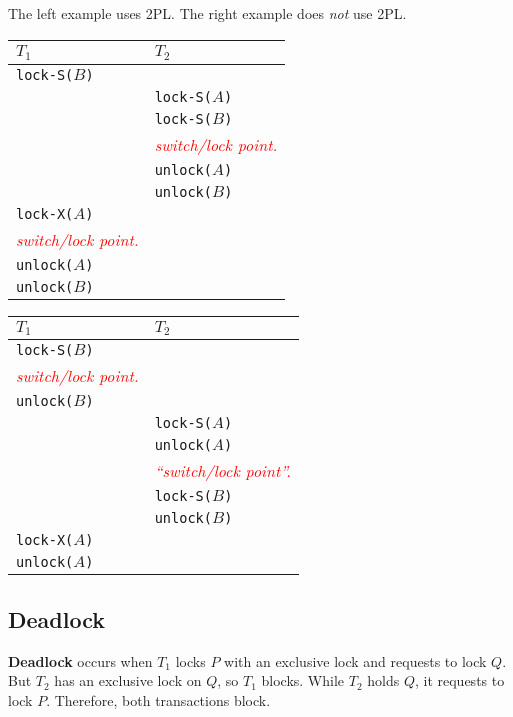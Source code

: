 \documentclass{report}
\newenvironment{definition}[1]{\begin{tcolorbox}[title={Definition: #1}]}{\end{tcolorbox}}
\newenvironment{example}{\begin{tcolorbox}[title={Example},colback=green!5!white,colframe=black!75!green]}{\end{tcolorbox}}
\renewcommand{\bf}[1]{\textbf{{#1}}}
\renewcommand{\tt}[1]{\texttt{{#1}}}
\renewcommand{\it}[1]{\textit{{#1}}}
\begin{document}
\begin{example}
    The left example uses 2PL. The right example does \it{not} use 2PL.

    {
        \centering
        \begin{tabular}{l|l}
            $T_1$ & $T_2$ \\
            \hline
            \tt{lock-S($B$)} & \\
                     & \tt{lock-S($A$)} \\
                     & \tt{lock-S($B$)} \\
                     & \it{\textcolor{red}{switch/lock point.}} \\
                     & \tt{unlock($A$)} \\
                     & \tt{unlock($B$)} \\
            \tt{lock-X($A$)} & \\
            \it{\textcolor{red}{switch/lock point.}} & \\
            \tt{unlock($A$)} & \\
            \tt{unlock($B$)} & \\
        \end{tabular}
        \hspace{2em}
        \begin{tabular}{l|l}
            $T_1$ & $T_2$ \\
            \hline
            \tt{lock-S($B$)} & \\
            \it{\textcolor{red}{switch/lock point.}} & \\
            \tt{unlock($B$)} & \\
                     & \tt{lock-S($A$)} \\
                     & \tt{unlock($A$)} \\
                     & \it{\textcolor{red}{``switch/lock point''.}} \\
                     & \tt{lock-S($B$)} \\
                     & \tt{unlock($B$)} \\
            \tt{lock-X($A$)} & \\
            \tt{unlock($A$)} & \\
        \end{tabular}
        \par
    }
\end{example}

\subsection{Deadlock}
\begin{definition}{Deadlock}
    \bf{Deadlock} occurs when $T_1$ locks $P$ with an exclusive lock and
    requests to lock $Q$. But $T_2$ has an exclusive lock on $Q$, so $T_1$
    blocks. While $T_2$ holds $Q$, it requests to lock $P$. Therefore, both
    transactions block.
\end{definition}
\end{document}
